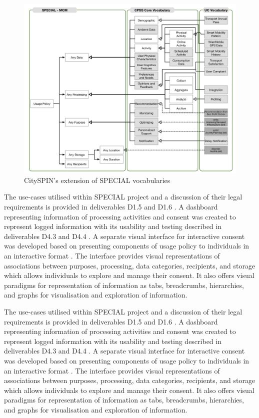 \begin{figure}[htbp]
    \centering
    \includegraphics[width=0.8\linewidth]{img/SPECIAL_CitySPIN.png}
    \caption{CitySPIN's extension of SPECIAL vocabularies \cite{fernandez_user_2019}}
    \label{fig:SPECIAL-CitySPIN}
\end{figure}

The use-cases utilised within SPECIAL project and a discussion of their legal requirements is provided in deliverables D1.5 \cite{bonatti_d1.5_2018} and D1.6 \cite{schlehahn_d1.6_2018}.
A dashboard representing information of processing activities and consent was created to represent logged information \cite{raschke_designing_2017}
 with its usability and testing described in deliverables D4.3 \cite{raschke_d4.3_2019} and D4.4 \cite{milosevic_d4.4_2019}.
A separate visual interface for interactive consent was developed based on presenting components of usage policy to individuals in an interactive format \cite{gritzalis_i_2019}.
The interface provides visual representations of associations between purposes, processing, data categories, recipients, and storage which allows individuals to explore and manage their consent. It also offers visual paradigms for representation of information as tabs, breadcrumbs, hierarchies, and graphs for visualisation and exploration of information. 

The use-cases utilised within SPECIAL project and a discussion of their legal requirements is provided in deliverables D1.5 \cite{bonatti_d1.5_2018} and D1.6 \cite{schlehahn_d1.6_2018}. A dashboard representing information of processing activities and consent was created to represent logged information \cite{raschke_designing_2017} with its usability and testing described in deliverables D4.3 \cite{raschke_d4.3_2019} and D4.4 \cite{milosevic_d4.4_2019}. A separate visual interface for interactive consent was developed based on presenting components of usage policy to individuals in an interactive format \cite{gritzalis_i_2019}. The interface provides visual representations of associations between purposes, processing, data categories, recipients, and storage which allows individuals to explore and manage their consent. It also offers visual paradigms for representation of information as tabs, breadcrumbs, hierarchies, and graphs for visualisation and exploration of information. 

